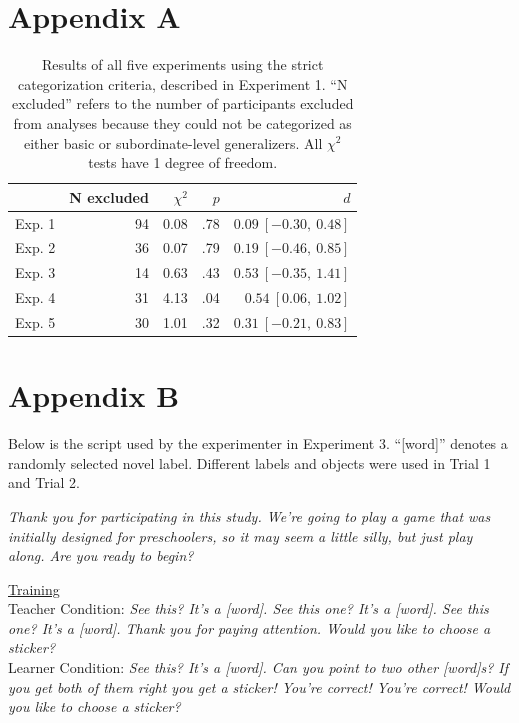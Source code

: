 \documentclass[man]{apa2}
\begin{document}
\section{Appendix A}

\begin{table}[h]
\centering
\begin{tabular}{rrrrr}
 \hline
 & N excluded & $\chi^2$ & $p$ & $d$ \\ 
 \hline
Exp. 1 & 94 & 0.08 & .78 & $0.09\ [-0.30,\ 0.48]$\\ 
Exp. 2 & 36 & 0.07 & .79 & $0.19\ [-0.46,\ 0.85]$ \\ 
Exp. 3 & 14 & 0.63 & .43 & $0.53\ [-0.35,\ 1.41]$ \\ 
Exp. 4 & 31 & 4.13 & .04 & $0.54\ [0.06,\ 1.02]$\\ 
Exp. 5 & 30 & 1.01 & .32 & $0.31\ [-0.21,\ 0.83]$\\ 
 \hline
\end{tabular}
\caption{Results of all five experiments using the strict categorization criteria, described in Experiment 1. ``N excluded'' refers to the number of participants excluded from analyses because they could not be categorized as either basic or subordinate-level generalizers. All $\chi^2$ tests have 1 degree of freedom. }
\label{strictResults}
\end{table}


\section{Appendix B}
Below is the script used by the experimenter in Experiment 3. ``[word]'' denotes a randomly selected novel label. Different labels and objects were used in Trial 1 and Trial 2. 

\vspace{5mm}

{\it Thank you for participating in this study. We're going to play a game that was initially designed for preschoolers, so it may seem a little silly, but just play along. Are you ready to begin?}
\vspace{2.5mm}

\noindent \underline{Training} \\
	Teacher Condition: {\it See this? It's a [word]. See this one? It's a [word]. See this one? It's a [word]. Thank you for paying attention. Would you like to choose a sticker? }
\\
Learner Condition: {\it See this? It's a [word]. Can you point to two other [word]s? If you get both of them right you get a sticker! You're correct! You're correct! Would you like to choose a sticker? }
\vspace{2.5mm}
 
\end{document}
